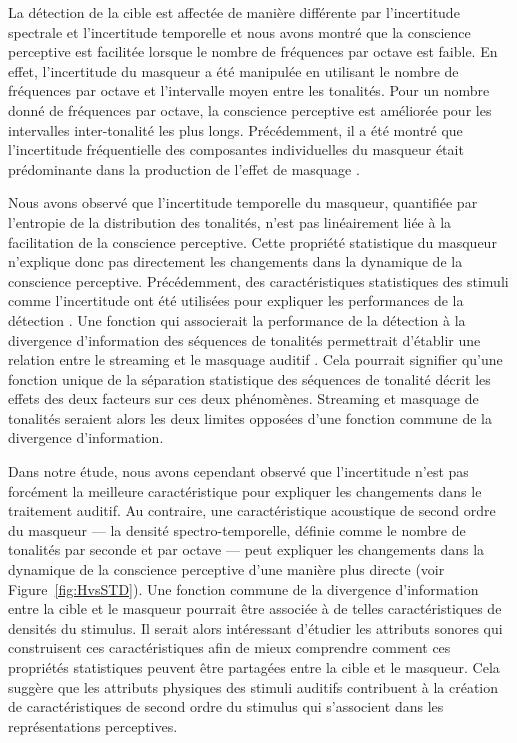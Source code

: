 La détection de la cible est affectée de manière différente par l'incertitude spectrale et l'incertitude temporelle et nous avons montré que la conscience perceptive est facilitée lorsque le nombre de fréquences par octave est faible. 
En effet, l'incertitude du masqueur a été manipulée en utilisant le nombre de fréquences par octave et l'intervalle moyen entre les tonalités. 
Pour un nombre donné de fréquences par octave, la conscience perceptive est améliorée pour les intervalles inter-tonalité les plus longs. 
Précédemment, il a été montré que l'incertitude fréquentielle des composantes individuelles du masqueur était prédominante dans la production de l'effet de masquage \citep{neff1995individual, neff1988effective}. 

Nous avons observé que l'incertitude temporelle du masqueur, quantifiée par l'entropie de la distribution des tonalités, n'est pas linéairement liée à la facilitation de la conscience perceptive. 
Cette propriété statistique du masqueur n'explique donc pas directement les changements dans la dynamique de la conscience perceptive. 
Précédemment, des caractéristiques statistiques des stimuli comme l'incertitude ont été utilisées pour expliquer les performances de la détection \citep{chang2016detection, lutfi2013information}. 
Une fonction qui associerait la performance de la détection à la divergence d'information des séquences de tonalités permettrait d'établir une relation entre le streaming et le masquage auditif \citep{chang2016detection}.
Cela pourrait signifier qu'une fonction unique de la séparation statistique des séquences de tonalité décrit les effets des deux facteurs sur ces deux phénomènes. 
Streaming et masquage de tonalités seraient alors les deux limites opposées d'une fonction commune de la divergence d'information. 

Dans notre étude, nous avons cependant observé que l'incertitude n'est pas forcément la meilleure caractéristique pour expliquer les changements dans le traitement auditif. 
Au contraire, une caractéristique acoustique de second ordre du masqueur --- la densité spectro-temporelle, définie comme le nombre de tonalités par seconde et par octave --- peut expliquer les changements dans la dynamique de la conscience perceptive d'une manière plus directe (voir Figure~\ref{fig:HvsSTD}). 
Une fonction commune de la divergence d'information entre la cible et le masqueur pourrait être associée à de telles caractéristiques de densités du stimulus. 
Il serait alors intéressant d'étudier les attributs sonores qui construisent ces caractéristiques afin de mieux comprendre comment ces propriétés statistiques peuvent être partagées entre la cible et le masqueur. 
Cela suggère que les attributs physiques des stimuli auditifs contribuent à la création de caractéristiques de second ordre du stimulus qui s'associent dans les représentations perceptives. 

